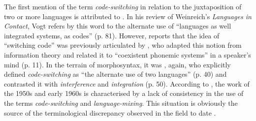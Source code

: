 The first mention of the term \textit {code-switching} in relation to the juxtaposition of two or more languages is attributed to \citet{vogt-rev-1954}. In his review of Weinreich's \textit{Languages in Contact}, Vogt refers by this word to the alternate use of ``languages as well integrated systems, as codes'' (p. 81). However,  \citet{alvarez-caccamo-switching-1998} reports that the idea of  ``switching code'' was previously articulated by \citet{jakobson-preliminaries-1976}, who adapted this notion from information theory and related it to ``coexistent phonemic systems'' in a speaker's mind (p. 11). In the terrain of morphosyntax, it was \citet{haugen-bilingualism-1956}, again, who explicitly defined \textit{code-switching} as ``the alternate use of two languages'' (p. 40) and contrasted it with \textit{interference} and \textit{integration} (p. 50). According to \citet{alvarez-caccamo-switching-1998}, the work of the 1950s and early 1960s is characterised by a lack of consistency in the use of the terms \textit{code-switching} and \textit{language-mixing}. This situation is obviously the source of the terminological discrepancy observed in the field to date \citep[for overviews, see][]{ammon-code-switching-2004, ammon-code-switching-2005}.

